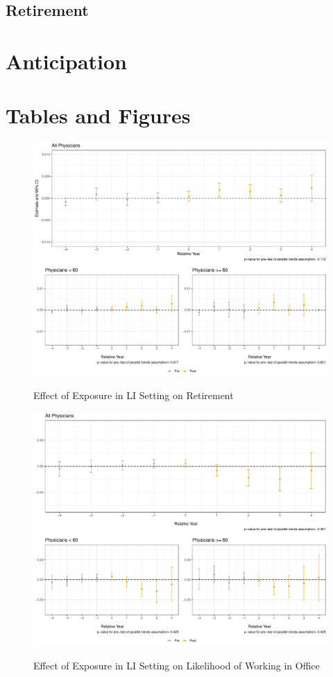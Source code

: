 \documentclass[11pt]{article}
\begin{document}
\subsection{Retirement}

\section{Anticipation}


\clearpage

\section{Tables and Figures}


\begin{figure}[p]
    \centering
    \caption{Effect of Exposure in LI Setting on Retirement}
    \includegraphics[scale=.4]{Objects/retire_plot_LI.pdf}
    \label{fig:retire_LI}
\end{figure}

\begin{figure}[p]
    \centering
    \caption{Effect of Exposure in LI Setting on Likelihood of Working in Office}
    \includegraphics[scale=.4]{Objects/officeind_plot_LI.pdf}
    \label{fig:officeind_LI}
\end{figure}
\end{document}
